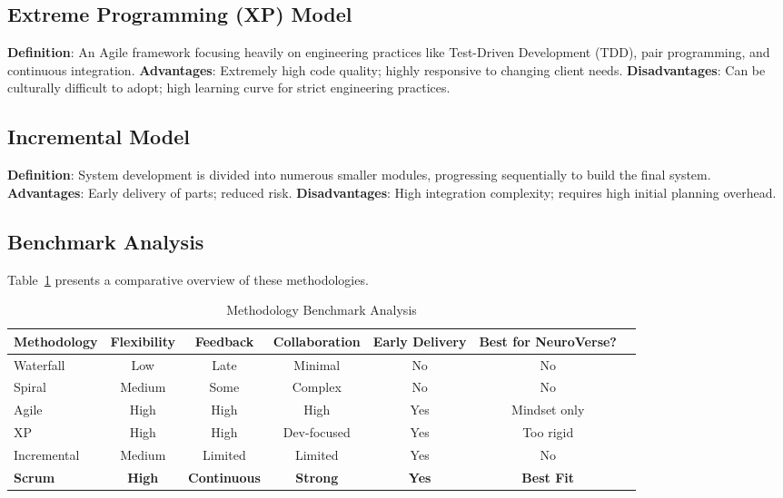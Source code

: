 \documentclass[a4paper,11pt]{report}
\begin{document}
\subsection{Extreme Programming (XP) Model}
\textbf{Definition}: An Agile framework focusing heavily on engineering practices like Test-Driven Development (TDD), pair programming, and continuous integration.
\textbf{Advantages}: Extremely high code quality; highly responsive to changing client needs.
\textbf{Disadvantages}: Can be culturally difficult to adopt; high learning curve for strict engineering practices.

\subsection{Incremental Model}
\textbf{Definition}: System development is divided into numerous smaller modules, progressing sequentially to build the final system.
\textbf{Advantages}: Early delivery of parts; reduced risk.
\textbf{Disadvantages}: High integration complexity; requires high initial planning overhead.

\subsection{Benchmark Analysis}
Table~\ref{tab:benchmark} presents a comparative overview of these methodologies.

\begin{table}[H]
\centering
\caption{Methodology Benchmark Analysis}
\label{tab:benchmark}
\begin{tabular}{lcccccc}
\toprule
\textbf{Methodology} & \textbf{Flexibility} & \textbf{Feedback} & \textbf{Collaboration} & \textbf{Early Delivery} & \textbf{Best for NeuroVerse?} \\
\midrule
Waterfall & Low & Late & Minimal & No & No \\
Spiral & Medium & Some & Complex & No & No \\
Agile & High & High & High & Yes & Mindset only \\
XP & High & High & Dev-focused & Yes & Too rigid \\
Incremental & Medium & Limited & Limited & Yes & No \\
\textbf{Scrum} & \textbf{High} & \textbf{Continuous} & \textbf{Strong} & \textbf{Yes} & \textbf{Best Fit} \\
\bottomrule
\end{tabular}
\end{table}
\end{document}
